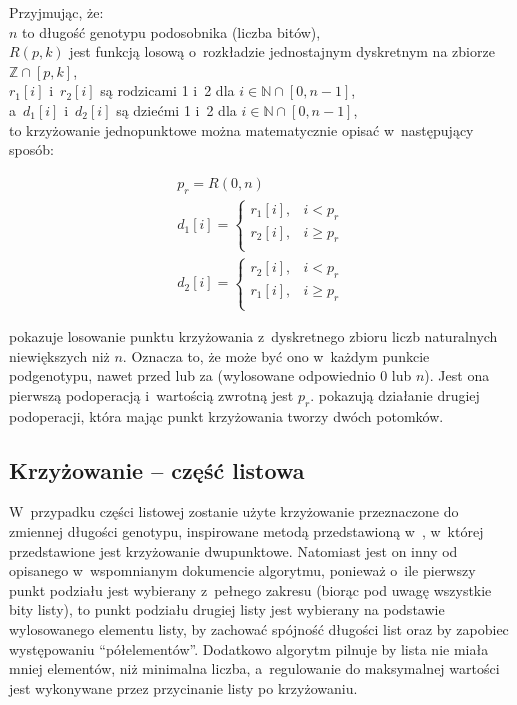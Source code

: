 Przyjmując, że:\\
$n$ to długość genotypu podosobnika (liczba bitów),\\
$R\left(p, k\right)$ jest funkcją losową
  o~rozkładzie jednostajnym dyskretnym
  na zbiorze $\mathbb{Z} \cap \left[p, k\right]$,\\
$r_1\left[i\right]$ i~$r_2\left[i\right]$
  są rodzicami 1 i~2 dla
  $i \in \mathbb{N} \cap \left[0, n-1\right]$,\\
a~$d_1\left[i\right]$ i~$d_2\left[i\right]$
  są dziećmi 1 i~2 dla
  $i \in \mathbb{N} \cap \left[0, n-1\right]$,\\
to krzyżowanie jednopunktowe można
matematycznie opisać w~następujący sposób:
\vspace{-\parskip}
\begin{fleqn}
  \begin{gather}
    \label{math:seq_cp_rand}
    p_r=R\left(0, n\right)\\
    \label{math:seq_child1}
    d_1\left[i\right]=\begin{cases}
      r_1[i]
        ,& i < p_r\\
      r_2[i]
        ,& i \geqslant p_r\\
    \end{cases}\\
    d_2\left[i\right]=\begin{cases}
      r_2[i]
        ,& i < p_r\\
      r_1[i]
        ,& i \geqslant p_r\\
    \end{cases}
    \label{math:seq_child2}
  \end{gather}
\end{fleqn}

 pokazuje losowanie
punktu krzyżowania z~dyskretnego zbioru
liczb naturalnych niewiększych niż $n$.
Oznacza to, że może być ono w~każdym punkcie podgenotypu,
nawet przed lub za (wylosowane odpowiednio $0$ lub $n$).
Jest ona pierwszą podoperacją
i~wartością zwrotną jest $p_r$.
pokazują działanie drugiej podoperacji,
która mając punkt krzyżowania tworzy dwóch potomków.

\subsection{Krzyżowanie -- część listowa}
\label{subsec:crossover_list}
W~przypadku części listowej zostanie
użyte krzyżowanie przeznaczone
do zmiennej długości genotypu,
inspirowane metodą przedstawioną
w~,
w~której przedstawione jest krzyżowanie dwupunktowe.
Natomiast jest on inny od opisanego
w~wspomnianym dokumencie algorytmu,
ponieważ o~ile pierwszy punkt podziału
jest wybierany z~pełnego zakresu
(biorąc pod uwagę wszystkie bity listy),
to punkt podziału drugiej listy jest wybierany
na podstawie wylosowanego elementu listy,
by zachować spójność długości list oraz
by zapobiec występowaniu ``półelementów''.
Dodatkowo algorytm pilnuje by lista
nie miała mniej elementów, niż minimalna liczba,
a~regulowanie do maksymalnej wartości jest
wykonywane przez przycinanie listy po krzyżowaniu.

